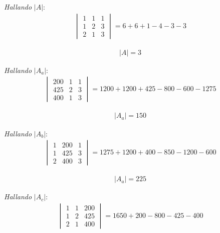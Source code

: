 \documentclass[11pt, a4paper]{article}
\begin{document}
    \\\\
    \textit{Hallando} $|A|$:
    \begin{align*}
      \begin{vmatrix}
        1 & 1 & 1\\
        1 & 2 & 3\\
        2 & 1 & 3
      \end{vmatrix} = 6+6+1-4-3-3
    \end{align*}
    \begin{center}
      \begin{align*}
        |A| = 3
      \end{align*}
    \end{center}
    \textit{Hallando} $|A_a|$:
    \begin{align*}
      \begin{vmatrix}
        200 & 1 & 1\\
        425 & 2 & 3\\
        400 & 1 & 3
      \end{vmatrix} = 1200+1200+425-800-600-1275
    \end{align*}
    \begin{center}
      \begin{align*}
        |A_a| = 150
      \end{align*}
    \end{center}
    \textit{Hallando} $|A_b|$:
    \begin{align*}
      \begin{vmatrix}
        1 & 200 & 1\\
        1 & 425 & 3\\
        2 & 400 & 3
      \end{vmatrix} = 1275+1200+400-850-1200-600
    \end{align*}
    \begin{center}
      \begin{align*}
        |A_a| = 225
      \end{align*}
    \end{center}
    \textit{Hallando} $|A_c|$:
    \begin{align*}
      \begin{vmatrix}
        1 & 1 & 200\\
        1 & 2 & 425\\
        2 & 1 & 400
      \end{vmatrix} = 1650+200-800-425-400
    \end{align*}
\end{document}
